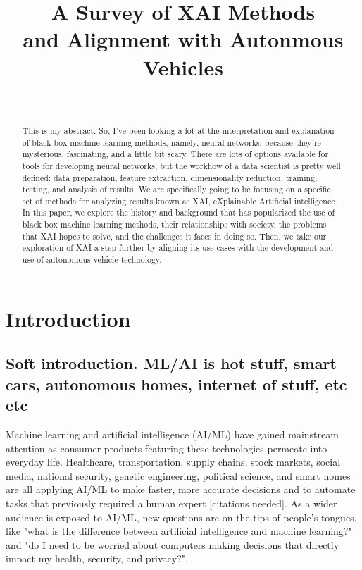\documentclass{IEEEtran}
\begin{document}
\title{A Survey of XAI Methods\\and Alignment with Autonmous Vehicles}
\author{
    \\
}
\maketitle

\begin{abstract}
This is my abstract.  So, I've been looking a lot at the interpretation and explanation of black box machine learning methods, namely, neural networks, because they're mysterious, fascinating, and a little bit scary.  There are lots of options available for tools for developing neural networks, but the workflow of a data scientist is pretty well defined:  data preparation, feature extraction, dimensionality reduction, training, testing, and analysis of results.  We are specifically going to be focusing on a specific set of methods for analyzing results known as XAI, eXplainable Artificial intelligence.  In this paper, we explore the history and background that has popularized the use of black box machine learning methods, their relationships with society, the problems that XAI hopes to solve, and the challenges it faces in doing so.  Then, we take our exploration of XAI a step further by aligning its use cases with the development and use of autonomous vehicle technology.
\end{abstract}

\section{Introduction}

\subsection{Soft introduction.  ML/AI is hot stuff, smart cars, autonomous homes, internet of stuff, etc etc}

Machine learning and artificial intelligence (AI/ML) have gained mainstream attention as consumer products featuring these technologies permeate into everyday life.  Healthcare, transportation, supply chains, stock markets, social media, national security, genetic engineering, political science, and smart homes are all applying AI/ML to make faster, more accurate decisions and to automate tasks that previously required a human expert [citations needed].  As a wider audience is exposed to AI/ML, new questions are on the tips of people's tongues, like "what is the difference between artificial intelligence and machine learning?" and "do I need to be worried about computers making decisions that directly impact my health, security, and privacy?".
\end{document}
